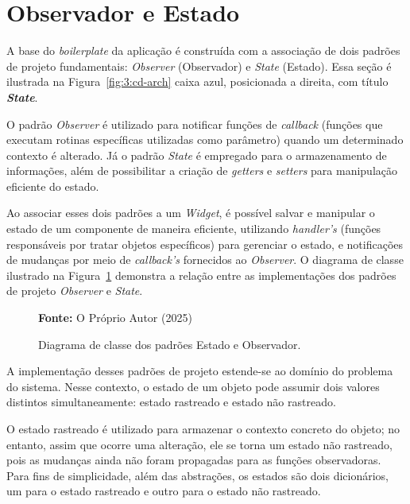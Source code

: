 \section{Observador e Estado}
\label{sec:3:estado-observador}

A base do \textit{boilerplate} da aplicação é construída com a associação de dois padrões de projeto fundamentais: \textit{Observer} (Observador) e \textit{State} (Estado). Essa seção é ilustrada na Figura~\ref{fig:3:cd-arch} caixa azul, posicionada a direita, com título \textbf{\textit{State}}.

O padrão \textit{Observer} é utilizado para notificar funções de \textit{callback} (funções que executam rotinas específicas utilizadas como parâmetro) quando um determinado contexto é alterado. Já o padrão \textit{State} é empregado para o armazenamento de informações, além de possibilitar a criação de \textit{getters} e \textit{setters} para manipulação eficiente do estado.

Ao associar esses dois padrões a um \textit{Widget}, é possível salvar e manipular o estado de um componente de maneira eficiente, utilizando \textit{handler's} (funções responsáveis por tratar objetos específicos) para gerenciar o estado, e notificações de mudanças por meio de \textit{callback's} fornecidos ao \textit{Observer}. O diagrama de classe ilustrado na Figura~\ref{fig:3:cd-state-observer} demonstra a relação entre as implementações dos padrões de projeto \textit{Observer} e \textit{State}.

\begin{figure}[h!]
    \centerline{}
    \caption{Diagrama de classe dos padrões Estado e Observador.}
    \centerline{\textbf{Fonte:} O Próprio Autor (2025)}
    \label{fig:3:cd-state-observer}
\end{figure}

A implementação desses padrões de projeto estende-se ao domínio do problema do sistema. Nesse contexto, o estado de um objeto pode assumir dois valores distintos simultaneamente: estado rastreado e estado não rastreado.

O estado rastreado é utilizado para armazenar o contexto concreto do objeto; no entanto, assim que ocorre uma alteração, ele se torna um estado não rastreado, pois as mudanças ainda não foram propagadas para as funções observadoras. Para fins de simplicidade, além das abstrações, os estados são dois dicionários, um para o estado rastreado e outro para o estado não rastreado.

